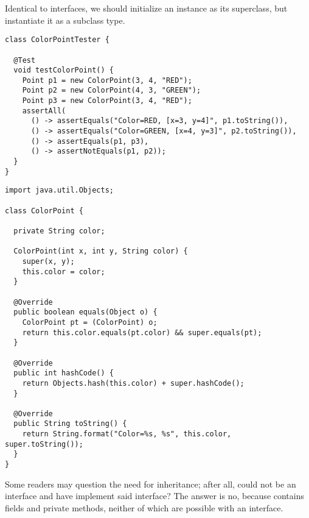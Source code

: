 Identical to interfaces, we should initialize an instance as its superclass, but instantiate it as a subclass type.

\begin{lstlisting}[language=MyJava]
class ColorPointTester {

  @Test
  void testColorPoint() {
    Point p1 = new ColorPoint(3, 4, "RED");
    Point p2 = new ColorPoint(4, 3, "GREEN");
    Point p3 = new ColorPoint(3, 4, "RED");
    assertAll(
      () -> assertEquals("Color=RED, [x=3, y=4]", p1.toString()),
      () -> assertEquals("Color=GREEN, [x=4, y=3]", p2.toString()),
      () -> assertEquals(p1, p3),
      () -> assertNotEquals(p1, p2));
  }
}
\end{lstlisting}

\begin{lstlisting}[language=MyJava]
import java.util.Objects;

class ColorPoint {

  private String color;

  ColorPoint(int x, int y, String color) {
    super(x, y);
    this.color = color;
  }

  @Override
  public boolean equals(Object o) {
    ColorPoint pt = (ColorPoint) o;
    return this.color.equals(pt.color) && super.equals(pt);
  }

  @Override
  public int hashCode() {
    return Objects.hash(this.color) + super.hashCode();
  }

  @Override
  public String toString() {
    return String.format("Color=%s, %s", this.color, super.toString());
  }
}
\end{lstlisting}

Some readers may question the need for inheritance; after all, could  not be an interface and have  implement said interface? The answer is no, because  contains fields and private methods, neither of which are possible with an interface.


